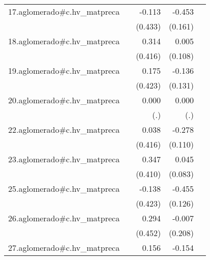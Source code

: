 {\begin{longtable}{l*{4}{D{.}{.}{-1}}}
\addlinespace
17.aglomerado#c.hv\_matpreca&                     &      -0.113         &      -0.453\sym{**} &                     \\
            &                     &     (0.433)         &     (0.161)         &                     \\
\addlinespace
18.aglomerado#c.hv\_matpreca&                     &       0.314         &       0.005         &                     \\
            &                     &     (0.416)         &     (0.108)         &                     \\
\addlinespace
19.aglomerado#c.hv\_matpreca&                     &       0.175         &      -0.136         &                     \\
            &                     &     (0.423)         &     (0.131)         &                     \\
\addlinespace
20.aglomerado#c.hv\_matpreca&                     &       0.000         &       0.000         &                     \\
            &                     &         (.)         &         (.)         &                     \\
\addlinespace
22.aglomerado#c.hv\_matpreca&                     &       0.038         &      -0.278\sym{*}  &                     \\
            &                     &     (0.416)         &     (0.110)         &                     \\
\addlinespace
23.aglomerado#c.hv\_matpreca&                     &       0.347         &       0.045         &                     \\
            &                     &     (0.410)         &     (0.083)         &                     \\
\addlinespace
25.aglomerado#c.hv\_matpreca&                     &      -0.138         &      -0.455\sym{***}&                     \\
            &                     &     (0.423)         &     (0.126)         &                     \\
\addlinespace
26.aglomerado#c.hv\_matpreca&                     &       0.294         &      -0.007         &                     \\
            &                     &     (0.452)         &     (0.208)         &                     \\
\addlinespace
27.aglomerado#c.hv\_matpreca&                     &       0.156         &      -0.154\sym{**} &                     \\

\end{longtable}}
